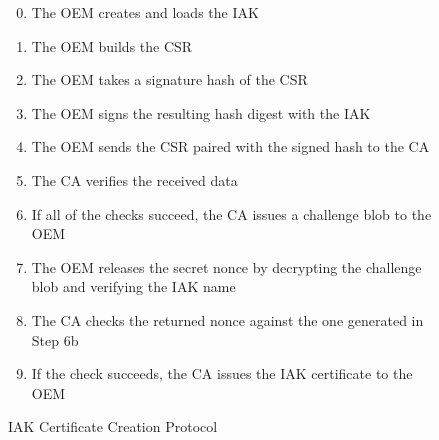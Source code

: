 \documentclass[runningheads]{llncs}
\begin{document}
\begin{figure}[hbtp]
\vspace{-\medskipamount}
\vspace{-\medskipamount}
\begin{enumerate}[itemsep=0pt,parsep=0pt,partopsep=0pt]
  \setcounter{enumi}{-1}
  \item The OEM creates and loads the IAK
  \item The OEM builds the CSR%
  \item The OEM takes a signature hash of the CSR
  \item The OEM signs the resulting hash digest with the IAK
  \item The OEM sends the CSR paired with the signed hash to the CA
  \item The CA verifies the received data%
  \item If all of the checks succeed, the CA issues a challenge blob to the OEM%
  \item The OEM releases the secret nonce by decrypting the challenge
    blob and verifying the IAK name
  \item The CA checks the returned nonce against the one generated in Step 6b
  \item If the check succeeds, the CA issues the IAK certificate to the OEM
  \end{enumerate}
  \caption{IAK Certificate Creation Protocol}
  \label{fig:iak-creation}
\end{figure}
\end{document}
